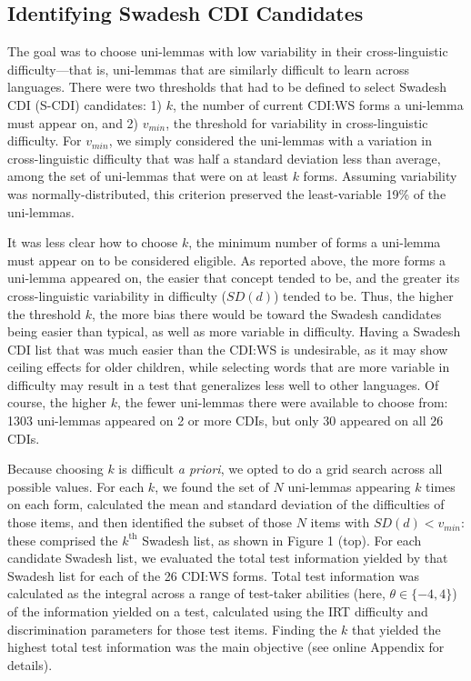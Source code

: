 \documentclass[10pt, letterpaper]{article}
\begin{document}
\hypertarget{identifying-swadesh-cdi-candidates}{%
\subsection{Identifying Swadesh CDI
Candidates}\label{identifying-swadesh-cdi-candidates}}

The goal was to choose uni-lemmas with low variability in their
cross-linguistic difficulty---that is, uni-lemmas that are similarly
difficult to learn across languages. There were two thresholds that had
to be defined to select Swadesh CDI (S-CDI) candidates: 1) \(k\), the
number of current CDI:WS forms a uni-lemma must appear on, and 2)
\(v_{min}\), the threshold for variability in cross-linguistic
difficulty. For \(v_{min}\), we simply considered the uni-lemmas with a
variation in cross-linguistic difficulty that was half a standard
deviation less than average, among the set of uni-lemmas that were on at
least \(k\) forms. Assuming variability was normally-distributed, this
criterion preserved the least-variable 19\% of the uni-lemmas.

It was less clear how to choose \(k\), the minimum number of forms a
uni-lemma must appear on to be considered eligible. As reported above,
the more forms a uni-lemma appeared on, the easier that concept tended
to be, and the greater its cross-linguistic variability in difficulty
(\(SD(d)\)) tended to be. Thus, the higher the threshold \(k\), the more
bias there would be toward the Swadesh candidates being easier than
typical, as well as more variable in difficulty. Having a Swadesh CDI
list that was much easier than the CDI:WS is undesirable, as it may show
ceiling effects for older children, while selecting words that are more
variable in difficulty may result in a test that generalizes less well
to other languages. Of course, the higher \(k\), the fewer uni-lemmas
there were available to choose from: 1303 uni-lemmas appeared on 2 or
more CDIs, but only 30 appeared on all 26 CDIs.

Because choosing \(k\) is difficult \emph{a priori}, we opted to do a
grid search across all possible values. For each \(k\), we found the set
of \(N\) uni-lemmas appearing \(k\) times on each form, calculated the
mean and standard deviation of the difficulties of those items, and then
identified the subset of those \(N\) items with \(SD(d) < v_{min}\):
these comprised the \(k^{\textrm{th}}\) Swadesh list, as shown in Figure
1 (top). For each candidate Swadesh list, we evaluated the total test
information yielded by that Swadesh list for each of the 26 CDI:WS
forms. Total test information was calculated as the integral across a
range of test-taker abilities (here, \(\theta \in \{-4,4\}\)) of the
information yielded on a test, calculated using the IRT difficulty and
discrimination parameters for those test items. Finding the \(k\) that
yielded the highest total test information was the main objective (see
online Appendix for details).
\end{document}
